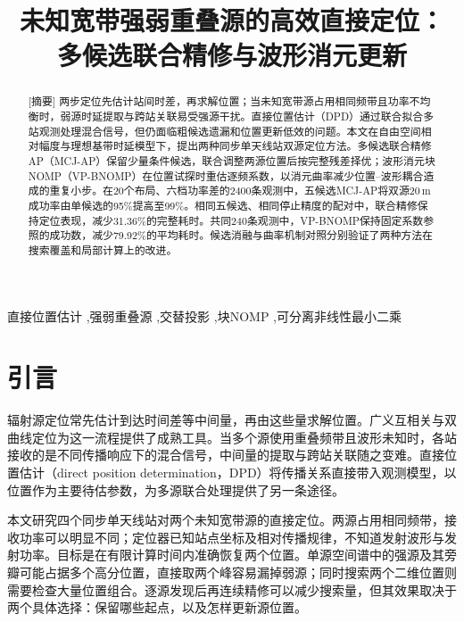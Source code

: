 \documentclass[a4paper,fleqn]{cas-sc}
\numberwithin{equation}{section}
\numberwithin{figure}{section}
\numberwithin{table}{section}
\begin{document}
\let\WriteBookmarks\relax
{}
\shortauthors{}
\title[mode=title]{未知宽带强弱重叠源的高效直接定位：\\多候选联合精修与波形消元更新}

\begin{abstract}[摘要]
两步定位先估计站间时差，再求解位置；当未知宽带源占用相同频带且功率不均衡时，弱源时延提取与跨站关联易受强源干扰。直接位置估计（DPD）通过联合拟合多站观测处理混合信号，但仍面临粗候选遗漏和位置更新低效的问题。本文在自由空间相对幅度与理想基带时延模型下，提出两种同步单天线站双源定位方法。多候选联合精修AP（MCJ-AP）保留少量条件候选，联合调整两源位置后按完整残差择优；波形消元块NOMP（VP-BNOMP）在位置试探时重估逐频系数，以消元曲率减少位置--波形耦合造成的重复小步。在20个布局、六档功率差的2400条观测中，五候选MCJ-AP将双源20\,m成功率由单候选的95\%提高至99\%。相同五候选、相同停止精度的配对中，联合精修保持定位表现，减少31.36\%的完整耗时。共同240条观测中，VP-BNOMP保持固定系数参照的成功数，减少79.92\%的平均耗时。候选消融与曲率机制对照分别验证了两种方法在搜索覆盖和局部计算上的改进。
\end{abstract}
\begin{keywords}[关键词]
直接位置估计 \sep 强弱重叠源 \sep 交替投影 \sep 块NOMP \sep 可分离非线性最小二乘
\end{keywords}


\maketitle

\section{引言}\label{sec:introduction}
辐射源定位常先估计到达时间差等中间量，再由这些量求解位置。广义互相关与双曲线定位为这一流程提供了成熟工具\cite{KnappCarter1976,ChanHo1994}。当多个源使用重叠频带且波形未知时，各站接收的是不同传播响应下的混合信号，中间量的提取与跨站关联随之变难。直接位置估计（direct position determination，DPD）将传播关系直接带入观测模型，以位置作为主要待估参数，为多源联合处理提供了另一条途径\cite{ChenHudsonYao2002,WeissAmar2005}。

本文研究四个同步单天线站对两个未知宽带源的直接定位。两源占用相同频带，接收功率可以明显不同；定位器已知站点坐标及相对传播规律，不知道发射波形与发射功率。目标是在有限计算时间内准确恢复两个位置。单源空间谱中的强源及其旁瓣可能占据多个高分位置，直接取两个峰容易漏掉弱源；同时搜索两个二维位置则需要检查大量位置组合。逐源发现后再连续精修可以减少搜索量，但其效果取决于两个具体选择：保留哪些起点，以及怎样更新源位置。
\end{document}
